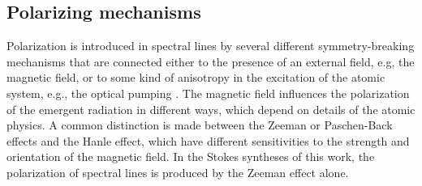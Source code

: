 \documentclass[iop,numberedappendix,twocolappendix,twocolumn]{emulateapj}
\begin{document}
\subsection{Polarizing mechanisms}\label{subsec:4.3}
%
Polarization is introduced in spectral lines by several different symmetry-breaking mechanisms that are connected either to the presence of an external field,
e.g, the magnetic field, or to some kind of anisotropy in the excitation of the atomic system, e.g., the optical pumping \citep{landi_deglinnocenti+landolfi2004}.
The magnetic field influences the polarization of the emergent radiation in different ways, which depend on details of the atomic physics.
A common distinction is made between the Zeeman or Paschen-Back effects and the Hanle effect, which have different sensitivities to the strength and orientation of the magnetic field.
In the Stokes syntheses of this work, the polarization of spectral lines is produced by the Zeeman effect alone.
%
\end{document}
